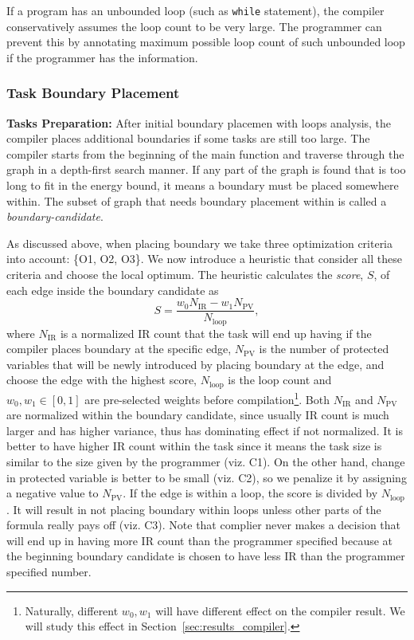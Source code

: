 If a program has an unbounded loop (such as {\tt while} statement), the compiler conservatively assumes the loop count to be very large. The programmer can prevent this by annotating maximum possible loop count of such unbounded loop if the programmer has the information.

\subsubsection{Task Boundary Placement}
\textbf{Tasks Preparation:} After initial boundary placemen with loops analysis, the compiler places additional boundaries if some tasks are still too large. The \sys compiler starts from the beginning of the main function and traverse through the graph in a depth-first search manner. If any part of the graph is found that is too long to fit in the energy bound, it means a boundary must be placed somewhere within. The subset of graph that needs boundary placement within is called a {\em boundary-candidate}.

As discussed above, when placing boundary we take three optimization criteria into account: \{O1, O2, O3\}. We now introduce a heuristic that consider all these criteria and choose the local optimum. The heuristic calculates the {\em score}, $S$, of each edge inside the boundary candidate as
%
\begin{equation}
S = \frac{w_{0} N_{\text{IR}} - w_{1} N_{\text{PV}}}{N_{\text{loop}}},\nonumber
\end{equation}
%
where $N_{\text{IR}}$ is a normalized IR count that the task will end up having if the compiler places boundary at the specific edge, $N_{\text{PV}}$ is the number of protected variables that will be newly introduced by placing boundary at the edge, and choose the edge with the highest score, $N_{\text{loop}}$ is the loop count and $w_{0},w_{1}\in [0,1]$ are pre-selected weights before compilation\footnote{Naturally, different $w_{0}, w_{1}$ will have different effect on the compiler result. We will study this effect in Section~\ref{sec:results_compiler}.}. Both $N_{\text{IR}}$ and $N_{\text{PV}}$ are normalized within the boundary candidate, since usually IR count is much larger and has higher variance, thus has dominating effect if not normalized. It is better to have higher IR count within the task since it means the task size is similar to the size given by the programmer (viz. C1). On the other hand, change in protected variable is better to be small (viz. C2), so we penalize it by assigning a negative value to $N_{\text{PV}}$. If the edge is within a loop, the score is divided by $N_{\text{loop}}$. It will result in not placing boundary within loops unless other parts of the formula really pays off (viz. C3). Note that complier never makes a decision that will end up in having more IR count than the programmer specified because at the beginning boundary candidate is chosen to have less IR than the programmer specified number.

